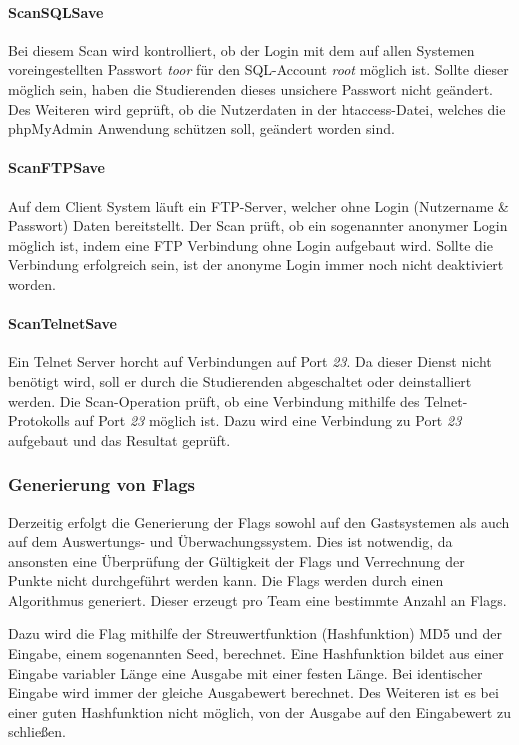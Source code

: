\paragraph{ScanSQLSave}\label{para:ScanSQLSave}
Bei diesem Scan wird kontrolliert, ob der Login mit dem auf allen Systemen voreingestellten Passwort \textit{toor} für den SQL-Account \textit{root} möglich ist. Sollte dieser möglich sein, haben die Studierenden dieses unsichere Passwort nicht geändert. Des Weiteren wird geprüft, ob die Nutzerdaten in der htaccess-Datei, welches die phpMyAdmin Anwendung schützen soll, geändert worden sind.

\paragraph{ScanFTPSave}\label{para:ScanFTPSave}
Auf dem Client System läuft ein FTP-Server, welcher ohne Login (Nutzername \& Passwort) Daten bereitstellt. Der Scan prüft, ob ein sogenannter anonymer Login möglich ist, indem eine FTP Verbindung ohne Login aufgebaut wird. Sollte die Verbindung erfolgreich sein, ist der anonyme Login immer noch nicht deaktiviert worden.

\paragraph{ScanTelnetSave}\label{para:ScanTelnetSave}
Ein Telnet Server horcht auf Verbindungen auf Port \textit{23}. Da dieser Dienst nicht benötigt wird, soll er durch die Studierenden abgeschaltet oder deinstalliert werden. Die Scan-Operation prüft, ob eine Verbindung mithilfe des Telnet-Protokolls auf Port \textit{23} möglich ist. Dazu wird eine Verbindung zu Port \textit{23} aufgebaut und das Resultat geprüft.

\subsubsection{Generierung von Flags}\label{subsubsec:Generierung_von_Flags}

Derzeitig erfolgt die Generierung der Flags sowohl auf den Gastsystemen als auch auf dem Auswertungs- und Überwachungssystem. Dies ist notwendig, da ansonsten eine Überprüfung der Gültigkeit der Flags und Verrechnung der Punkte nicht durchgeführt werden kann. Die Flags werden durch einen Algorithmus generiert. Dieser erzeugt pro Team eine bestimmte Anzahl an Flags. 

Dazu wird die Flag mithilfe der Streuwertfunktion (Hashfunktion) MD5 und der Eingabe, einem sogenannten Seed, berechnet. Eine Hashfunktion bildet aus einer Eingabe variabler Länge eine Ausgabe mit einer festen Länge. Bei identischer Eingabe wird immer der gleiche Ausgabewert berechnet. Des Weiteren ist es bei einer guten Hashfunktion nicht möglich, von der Ausgabe auf den Eingabewert zu schließen. \cite{menezesHandbookAppliedCryptography1996}


